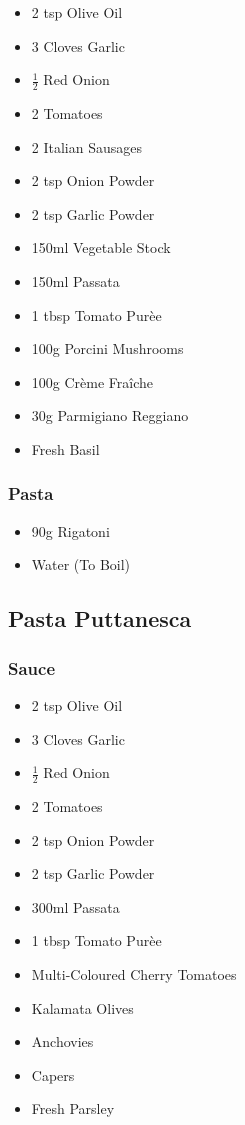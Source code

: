 \documentclass[11pt, english]{article}
\begin{document}
	\begin{itemize}
	\setlength\itemsep{0cm}
		\item 2 tsp Olive Oil
		\item 3 Cloves Garlic
		\item $\frac{1}{2}$ Red Onion
		\item 2 Tomatoes
		\item 2 Italian Sausages
		\item 2 tsp Onion Powder
		\item 2 tsp Garlic Powder
		\item 150ml Vegetable Stock
		\item 150ml Passata
		\item 1 tbsp Tomato Pur\`{e}e
		\item 100g Porcini Mushrooms
		\item 100g Cr\`{e}me Fra\^{i}che
		\item 30g Parmigiano Reggiano
		\item Fresh Basil
	\end{itemize}

		\subsubsection*{Pasta}

        \begin{itemize}
        \setlength\itemsep{0cm}
                \item 90g Rigatoni
                \item Water (To Boil)
        \end{itemize}

\newpage

	\subsection{Pasta Puttanesca}

		\subsubsection*{Sauce}
		
	\begin{itemize}
	\setlength\itemsep{0cm}
		\item 2 tsp Olive Oil
		\item 3 Cloves Garlic
		\item $\frac{1}{2}$ Red Onion
		\item 2 Tomatoes
		\item 2 tsp Onion Powder
		\item 2 tsp Garlic Powder
		\item 300ml Passata
		\item 1 tbsp Tomato Pur\`{e}e
		\item Multi-Coloured Cherry Tomatoes
		\item Kalamata Olives
		\item Anchovies
		\item Capers
		\item Fresh Parsley

	\end{itemize}
\end{document}
